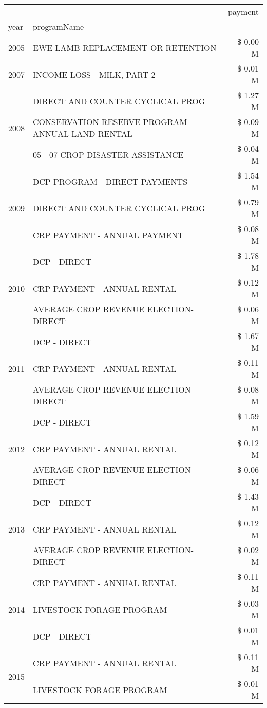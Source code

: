 \begin{tabular}{llr}
\toprule
 &  & payment \\
year & programName &  \\
\midrule
2005 & EWE LAMB REPLACEMENT OR RETENTION & \$ 0.00 M \\
\cline{1-3}
2007 & INCOME LOSS - MILK, PART 2 & \$ 0.01 M \\
\cline{1-3}
\multirow[t]{3}{*}{2008} & DIRECT AND COUNTER CYCLICAL PROG & \$ 1.27 M \\
 & CONSERVATION RESERVE PROGRAM - ANNUAL LAND RENTAL & \$ 0.09 M \\
 & 05 - 07 CROP DISASTER ASSISTANCE & \$ 0.04 M \\
\cline{1-3}
\multirow[t]{3}{*}{2009} & DCP PROGRAM - DIRECT PAYMENTS & \$ 1.54 M \\
 & DIRECT AND COUNTER CYCLICAL PROG & \$ 0.79 M \\
 & CRP PAYMENT - ANNUAL PAYMENT & \$ 0.08 M \\
\cline{1-3}
\multirow[t]{3}{*}{2010} & DCP - DIRECT & \$ 1.78 M \\
 & CRP PAYMENT - ANNUAL RENTAL & \$ 0.12 M \\
 & AVERAGE CROP REVENUE ELECTION-DIRECT & \$ 0.06 M \\
\cline{1-3}
\multirow[t]{3}{*}{2011} & DCP - DIRECT & \$ 1.67 M \\
 & CRP PAYMENT - ANNUAL RENTAL & \$ 0.11 M \\
 & AVERAGE CROP REVENUE ELECTION-DIRECT & \$ 0.08 M \\
\cline{1-3}
\multirow[t]{3}{*}{2012} & DCP - DIRECT & \$ 1.59 M \\
 & CRP PAYMENT - ANNUAL RENTAL & \$ 0.12 M \\
 & AVERAGE CROP REVENUE ELECTION-DIRECT & \$ 0.06 M \\
\cline{1-3}
\multirow[t]{3}{*}{2013} & DCP - DIRECT & \$ 1.43 M \\
 & CRP PAYMENT - ANNUAL RENTAL & \$ 0.12 M \\
 & AVERAGE CROP REVENUE ELECTION-DIRECT & \$ 0.02 M \\
\cline{1-3}
\multirow[t]{3}{*}{2014} & CRP PAYMENT - ANNUAL RENTAL & \$ 0.11 M \\
 & LIVESTOCK FORAGE PROGRAM & \$ 0.03 M \\
 & DCP - DIRECT & \$ 0.01 M \\
\cline{1-3}
\multirow[t]{3}{*}{2015} & CRP PAYMENT - ANNUAL RENTAL & \$ 0.11 M \\
 & LIVESTOCK FORAGE PROGRAM & \$ 0.01 M \\

\end{tabular}
